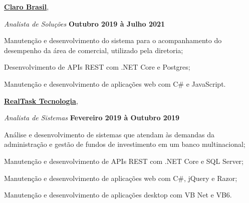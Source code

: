 \documentclass[10pt]{article}
\newenvironment{outerlist}[1][\enskip\textbullet]%
{\begin{itemize}[#1]}{\end{itemize}%
    \vspace{-1em}}
\newenvironment{innerlist}[1][\enskip\textbullet]%
          {\begin{compactitem}[#1]}{\end{compactitem}}
\newcommand{\blankline}{\quad\pagebreak[2]}
\begin{document}
				\href{http://claro.com.br}{\textbf{Claro Brasil}},
				\begin{outerlist}
					\item[] \textit{Analista de Soluções}
					\hfill \textbf{Outubro 2019 à Julho 2021}
					\begin{innerlist}
						\item Manutenção e desenvolvimento do sistema para o acompanhamento do desempenho da área de comercial, utilizado pela diretoria;
						\item Desenvolvimento de APIs REST com .NET Core e Postgres;
						\item Manutenção e desenvolvimento de aplicações web com C\# e JavaScript.
					\end{innerlist}
				\end{outerlist}                	
				\blankline
				
                \href{http://realtask.com.br}{\textbf{RealTask Tecnologia}},
                \begin{outerlist}
                	\item[] \textit{Analista de Sistemas}
                	\hfill \textbf{Fevereiro 2019 à Outubro 2019}
                	\begin{innerlist}
                			\item Análise e desenvolvimento de sistemas que atendam às demandas da administração e gestão de fundos de investimento em um banco multinacional;
                			\item Manutenção e desenvolvimento de APIs REST com .NET Core e SQL Server;
                			\item Manutenção e desenvolvimento de aplicações web com C\#, jQuery e Razor;
                			\item Manutenção e desenvolvimento de aplicações desktop com VB Net e VB6.
                	\end{innerlist}
                \end{outerlist}                	
                \blankline
                
\end{document}
